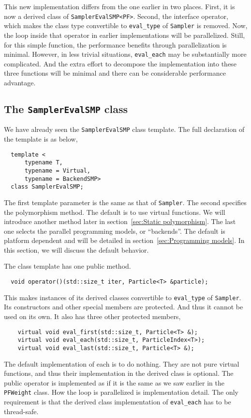 This new implementation differs from the one earlier in two places. First, it
is now a derived class of \verb|SamplerEvalSMP<PF>|. Second, the interface
operator, which makes the class type convertible to \verb|eval_type| of
\verb|Sampler| is removed. Now, the loop inside that operator in earlier
implementations will be parallelized. Still, for this simple function, the
performance benefits through parallelization is minimal. However, in less
trivial situations, \verb|eval_each| may be substantially more complicated. And
the extra effort to decompose the implementation into these three functions
will be minimal and there can be considerable performance advantage.

\subsection{The \texttt{SamplerEvalSMP} class}
\label{sub:The SamplerEvalSMP class}

We have already seen the \verb|SamplerEvalSMP| class template. The full
declaration of the template is as below,
\begin{Verbatim}
  template <
      typename T,
      typename = Virtual,
      typename = BackendSMP>
  class SamplerEvalSMP;
\end{Verbatim}
The first template parameter is the same as that of \verb|Sampler|. The second
specifies the polymorphism method. The default is to use virtual functions. We
will introduce another method later in section~\ref{sec:Static polymorphism}.
The last one selects the parallel programming models, or ``backends''. The
default is platform dependent and will be detailed in
section~\ref{sec:Programming models}. In this section, we will discuss the
default behavior.

The class template has one public method.
\begin{Verbatim}
  void operator()(std::size_t iter, Particle<T> &particle);
\end{Verbatim}
This makes instances of its derived classes convertible to \verb|eval_type| of
\verb|Sampler|. Its constructors and other special members are protected. And
thus it cannot be used on its own. It also has three other protected members,
\begin{Verbatim}
    virtual void eval_first(std::size_t, Particle<T> &);
    virtual void eval_each(std::size_t, ParticleIndex<T>);
    virtual void eval_last(std::size_t, Particle<T> &);
\end{Verbatim}
The default implementation of each is to do nothing. They are not pure virtual
functions, and thus their implementation in the derived class is optional. The
public operator is implemented as if it is the same as we saw earlier in the
\verb|PFWeight| class. How the loop is parallelized is implementation detail.
The only requirement is that the derived class implementation of
\verb|eval_each| has to be thread-safe.


